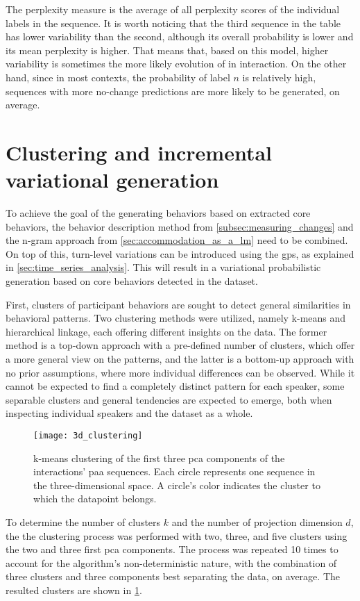 \noindent
%
The perplexity measure is the average of all perplexity scores of the individual labels in the sequence.
It is worth noticing that the third sequence in the table has lower variability than the second, although its overall probability is lower and its mean perplexity is higher.
That means that, based on this model, higher variability is sometimes the more likely evolution of in interaction.
On the other hand, since in most contexts, the probability of label $n$ is relatively high, sequences with more no-change predictions are more likely to be generated, on average.

\section{Clustering and incremental variational generation}
\label{sec:clustering_and_incremental_generation}

To achieve the goal of the generating behaviors based on extracted core behaviors, the behavior description method from \cref{subsec:measuring_changes} and the n-gram approach from \cref{sec:accommodation_as_a_lm} need to be combined.
On top of this, turn-level variations can be introduced using the \acp{gp}, as explained in \cref{sec:time_series_analysis}.
This will result in a variational probabilistic generation based on core behaviors detected in the dataset.

First, clusters of participant behaviors are sought to detect general similarities in behavioral patterns.
Two clustering methods were utilized, namely k-means and hierarchical linkage, each offering different insights on the data.
The former method is a top-down approach with a pre-defined number of clusters, which offer a more general view on the patterns, and the latter is a bottom-up approach with no prior assumptions, where more individual differences can be observed.
While it cannot be expected to find a completely distinct pattern for each speaker, some separable clusters and general tendencies are expected to emerge, both when inspecting individual speakers and the dataset as a whole.
%
\begin{figure}[t]
	\centering
	\texttt{[image: 3d\_clustering]}
	\caption[3D \acs{pca} components projection of accommodation changes clustering]
		{k-means clustering of the first three \acs{pca} components of the interactions' \acs{paa} sequences.
		Each circle represents one sequence in the three-dimensional space.
		A circle's color indicates the cluster to which the datapoint belongs.}
	\label{fig:k-means_clustering}
\end{figure}
%
To determine the number of clusters $k$ and the number of projection dimension $d$, the the clustering process was performed with two, three, and five clusters using the two and three first \ac{pca} components.
The process was repeated 10 times to account for the algorithm's non-deterministic nature, with the combination of three clusters and three components best separating the data, on average.
The resulted clusters are shown in \cref{fig:k-means_clustering}.

